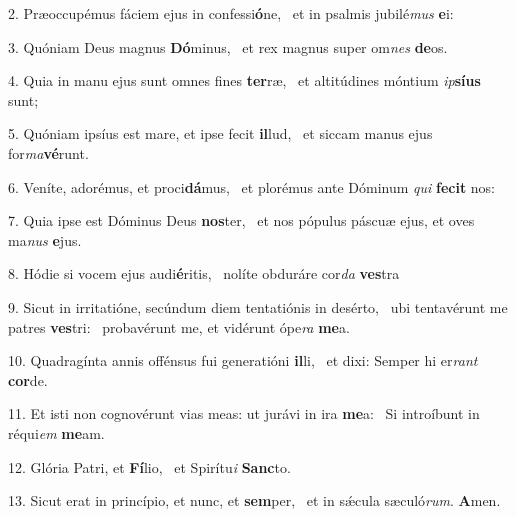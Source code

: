 2. Præoccupémus fáciem ejus in confessi\textbf{ó}ne, \ast\  et in psalmis jubilé\textit{mus} \textbf{e}i:\

3. Quóniam Deus magnus \textbf{Dó}minus, \ast\  et rex magnus super om\textit{nes} \textbf{de}os.\

4. Quia in manu ejus sunt omnes fines \textbf{ter}ræ, \ast\  et altitúdines móntium \textit{ip}\textbf{sí}\textbf{us} sunt;\

5. Quóniam ipsíus est mare, et ipse fecit \textbf{il}lud, \ast\  et siccam manus ejus for\textit{ma}\textbf{vé}runt.\

6. Veníte, adorémus, et proci\textbf{dá}mus, \ast\  et plorémus ante Dóminum \textit{qui} \textbf{fe}\textbf{cit} nos:\

7. Quia ipse est Dóminus Deus \textbf{nos}ter, \ast\  et nos pópulus páscuæ ejus, et oves ma\textit{nus} \textbf{e}jus.\

8. Hódie si vocem ejus audi\textbf{é}ritis, \ast\  nolíte obduráre cor\textit{da} \textbf{ves}tra\

9. Sicut in irritatióne, secúndum diem tentatiónis in desérto, \dag\  ubi tentavérunt me patres \textbf{ves}tri: \ast\  probavérunt me, et vidérunt ópe\textit{ra} \textbf{me}a.\

10. Quadragínta annis offénsus fui generatióni \textbf{il}li, \ast\  et dixi: Semper hi er\textit{rant} \textbf{cor}de.\

11. Et isti non cognovérunt vias meas: ut jurávi in ira \textbf{me}a: \ast\  Si introíbunt in réqui\textit{em} \textbf{me}am.\

12. Glória Patri, et \textbf{Fí}lio, \ast\  et Spirítu\textit{i} \textbf{Sanc}to.\

13. Sicut erat in princípio, et nunc, et \textbf{sem}per, \ast\  et in sǽcula sæculó\textit{rum}. \textbf{A}men.\

